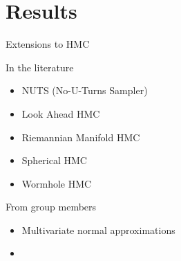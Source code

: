 \documentclass{beamer}
\begin{document}
    \section{Results}


    \begin{frame}{Extensions to HMC}

    \begin{block}{In the literature}
        \begin{itemize}
            \item NUTS (No-U-Turns Sampler)
            \item Look Ahead HMC
            \item Riemannian Manifold HMC
            \item Spherical HMC
            \item Wormhole HMC
        \end{itemize}
    \end{block}

    \begin{block}{From group members}
        \begin{itemize}
            \item Multivariate normal approximations
            \item
        \end{itemize}
    \end{block}

    \end{frame}
\end{document}
